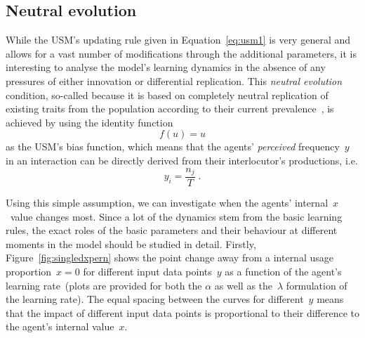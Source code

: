 \subsection{Neutral evolution}
\label{sec:usmneutral}


While the USM's updating rule given in Equation~\ref{eq:usm1} is very general and allows for a vast number of modifications through the additional parameters, it is interesting to analyse the model's learning dynamics in the absence of any pressures of either innovation or differential replication.
This \emph{neutral evolution} condition, so-called because it is based on completely neutral replication of existing traits from the population according to their current prevalence~\citep{Blythe2012neutral}, is achieved by using the identity function
\begin{equation}
f(u) = u
\end{equation}
as the USM's bias function, which means that the agents' \emph{perceived} frequency~$y$ in an interaction can be directly derived from their interlocutor's productions, i.e.
\begin{equation}
y_i = \frac{n_j}{T}\;.
\end{equation}

Using this simple assumption, we can investigate when the agents' internal~$x$~value changes most. Since a lot of the dynamics stem from the basic learning rules, the exact roles of the basic parameters and their behaviour at different moments in the model should be studied in detail.
Firstly, Figure~\ref{fig:singledxpern} shows the point change away from a internal usage proportion~$x=0$ for different input data points~$y$ as a function of the agent's learning rate~(plots are provided for both the $\alpha$ as well as the~$\lambda$ formulation of the learning rate).
The equal spacing between the curves for different~$y$ means that the impact of different input data points is proportional to their difference to the agent's internal value~$x$.

